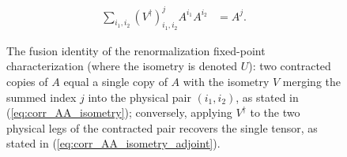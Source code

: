 \begin{figure}[ht]
\begin{align}
        \sum_{i_1,i_2}(V^\dagger)^j_{i_1,i_2}A^{i_1}A^{i_2}
         & =A^j.
        \label{eq:corr_AA_isometry_adjoint}
    \end{align}
    \caption{The fusion identity of the renormalization fixed-point
        characterization \cite[Theorem~3.1, lines~396--412]{Cirac2016MPDO_arXiv}
        (where the isometry is denoted $U$): two contracted copies of $A$ equal
        a single copy of $A$ with the isometry $V$ merging the summed index $j$
        into the physical pair $(i_1,i_2)$, as stated in
        (\ref{eq:corr_AA_isometry}); conversely, applying $V^\dagger$ to the
        two physical legs of the contracted pair recovers the single tensor, as
        stated in (\ref{eq:corr_AA_isometry_adjoint}).}
    \label{fig:rfp_kraus_isometry}
\end{figure}
